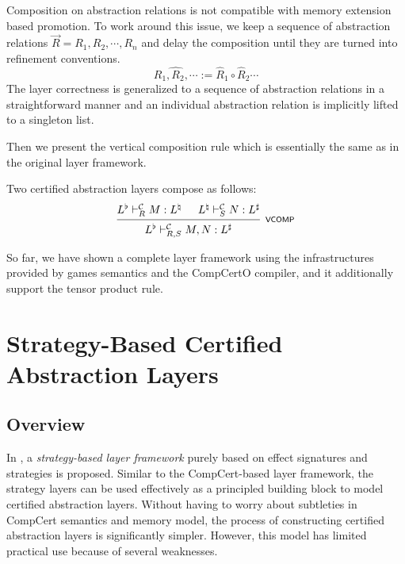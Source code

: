 \documentclass[acmsmall,review,anonymous]{acmart}\settopmatter{printfolios=true,printccs=false,printacmref=false}
\begin{document}
Composition on abstraction relations
is not compatible with
memory extension based promotion\cite[\S4.4]{thesis}.
To work around this issue,
we keep a sequence of abstraction relations
$\vec{R} = R_1, R_2, \cdots, R_n$
and delay the composition
until they are turned into refinement conventions.
\[
  \widehat{R_1, R_2, \cdots} :=
  \hat{R}_1 \circ \hat{R}_2 \cdots
\]
The layer correctness
is generalized to a sequence of
abstraction relations
in a straightforward manner
and an individual abstraction relation
is implicitly lifted to a singleton list.

Then we present the vertical composition rule
which is essentially the same as
in the original layer framework.

\begin{theorem}
  Two certified abstraction layers compose
  as follows:
  \[
    \begin{prooftree}
      \hypo{L^\flat \vdash^\mathcal{C}_{R} M : L^\natural}
      \hypo{L^\natural \vdash^\mathcal{C}_{S} N : L^\sharp}
      \infer2[\scriptsize\kw{VCOMP}]{L^\flat \vdash^\mathcal{C}_{R,S} M, N : L^\sharp}
    \end{prooftree}
  \]
  \vspace{-10pt}
\end{theorem}

So far,
we have shown a complete layer framework
using the infrastructures
provided by games semantics and the CompCertO compiler,
and it additionally
support the tensor product rule.



\section{Strategy-Based Certified Abstraction Layers} \label{sec:rbgs-cal} %

\subsection{Overview}

In \citet{rbgs-cal},
a \emph{strategy-based layer framework}
purely based on
effect signatures and strategies is proposed.
Similar to the CompCert-based layer framework,
the strategy layers can be used effectively
as a principled building block
to model certified abstraction layers.
Without having to worry about
subtleties in CompCert semantics and memory model,
the process of constructing certified abstraction layers
is significantly simpler.
However,
this model has limited practical use
because of several weaknesses.
\end{document}
